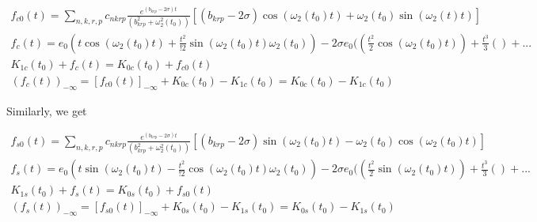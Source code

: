 \documentclass[11pt]{elsarticle}
\begin{document}


\begin{eqnarray*}\label{app_F_7_eq_6}   
f_{c0}(t)= \displaystyle\sum\limits_{n,k,r,p}  c_{nkrp}  \frac{ e^{(b_{krp}-2\sigma) t}}{ (b_{krp}^{2} + \omega_2^{2}(t_0))} [(b_{krp}-2\sigma) \cos{ (\omega_2(t_0) t)} +  \omega_2(t_0) \sin{ (\omega_2(t) t)}] \\
f_c(t) =  e_0 ( t  \cos{ ( \omega_2(t_0) t)} + \frac{t^{2}}{!2}  \sin{ ( \omega_2(t_0) t)}\omega_2(t_0)) - 2 \sigma e_0 (( \frac{t^{2}}{2}  \cos{ ( \omega_2(t_0) t)} )  + \frac{t^{3}}{3}  ( ) + ... \\  %
K_{1c}(t_0) + f_c(t) = K_{0c}(t_0) + f_{c0}(t) \\
(f_c(t))_{-\infty} = [f_{c0}(t)]_{-\infty}  + K_{0c}(t_0) - K_{1c}(t_0) =  K_{0c}(t_0) - K_{1c}(t_0) 
\end{eqnarray*}
\begin{equation} \end{equation}

Similarly, we get

\begin{eqnarray*}\label{app_F_7_eq_7}   
f_{s0}(t)= \displaystyle\sum\limits_{n,k,r,p}  c_{nkrp}  \frac{ e^{(b_{krp}-2\sigma) t}}{ (b_{krp}^{2} + \omega_2^{2}(t_0))} [(b_{krp}-2\sigma) \sin{ (\omega_2(t_0) t)} -  \omega_2(t_0) \cos{ (\omega_2(t_0) t)}] \\
f_s(t) = e_0 ( t  \sin{ ( \omega_2(t_0) t)} - \frac{t^{2}}{!2}  \cos{ ( \omega_2(t_0) t)}\omega_2(t_0)) - 2 \sigma e_0 (( \frac{t^{2}}{2}  \sin{ ( \omega_2(t_0) t)} )   + \frac{t^{3}}{3}  ( ) + ...  \\ %
K_{1s}(t_0) + f_s(t) = K_{0s}(t_0) + f_{s0}(t) \\
(f_s(t))_{-\infty} = [f_{s0}(t)]_{-\infty}  + K_{0s}(t_0) - K_{1s}(t_0) =  K_{0s}(t_0) - K_{1s}(t_0) 
\end{eqnarray*}
\begin{equation} \end{equation}
\end{document}
